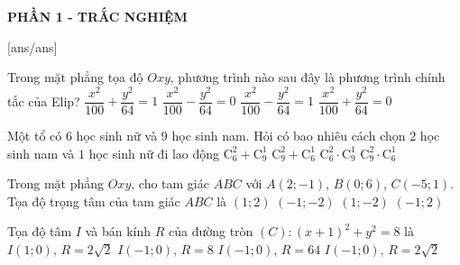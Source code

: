 
\begin{center}
	\textbf{PHẦN 1 - TRẮC NGHIỆM}
\end{center}

[ans/ans]
\begin{ex}%
	Trong mặt phẳng tọa độ $Oxy$, phương trình nào sau đây là phương trình chính tắc của Elip?
	\choice
	{\True $\dfrac{x^2}{100}+\dfrac{y^2}{64}=1$}
	{$\dfrac{x^2}{100}-\dfrac{y^2}{64}=0$}
	{$\dfrac{x^2}{100}-\dfrac{y^2}{64}=1$}
	{$\dfrac{x^2}{100}+\dfrac{y^2}{64}=0$}
\end{ex}
\begin{ex}%
	Một tổ có $6$ học sinh nữ và $9$ học sinh nam. Hỏi có bao nhiêu cách chọn $2$ học sinh nam và $1$ học sinh nữ đi lao động
	\choice
	{$\mathrm{C}_6^2+\mathrm{C}_9^1$}
	{$\mathrm{C}_9^2+\mathrm{C}_6^1$}
	{$\mathrm{C}_6^2\cdot \mathrm{C}_9^1$}
	{\True $\mathrm{C}_9^2\cdot \mathrm{C}_6^1$}
\end{ex}
\begin{ex}%
	Trong mặt phẳng $Oxy$, cho tam giác $ABC$ với $A(2;-1)$, $B(0;6)$, $C(-5;1)$. Tọa độ trọng tâm của tam giác $ABC$ là
	\choice
	{$(1;2)$}
	{$(-1;-2)$}
	{$(1;-2)$}
	{\True $(-1;2)$}
\end{ex}
\begin{ex}%
	Tọa độ tâm $I$ và bán kính $R$ của đường tròn $(C)\colon (x+1)^2+y^2=8$ là
	\choice
	{$I(1;0)$, $R=2\sqrt{2}$}
	{$I(-1;0)$, $R=8$}
	{$I(-1;0)$, $R=64$}
	{\True $I(-1;0)$, $R=2\sqrt{2}$}
\end{ex}
